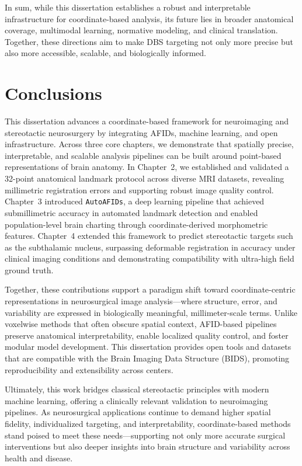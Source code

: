 In sum, while this dissertation establishes a robust and interpretable infrastructure for coordinate-based analysis, its future lies in broader anatomical coverage, multimodal learning, normative modeling, and clinical translation. Together, these directions aim to make DBS targeting not only more precise but also more accessible, scalable, and biologically informed.


\section{Conclusions}

This dissertation advances a coordinate-based framework for neuroimaging and stereotactic neurosurgery by integrating AFIDs, machine learning, and open infrastructure. Across three core chapters, we demonstrate that spatially precise, interpretable, and scalable analysis pipelines can be built around point-based representations of brain anatomy. In Chapter~2, we established and validated a 32-point anatomical landmark protocol across diverse MRI datasets, revealing millimetric registration errors and supporting robust image quality control. Chapter~3 introduced \texttt{AutoAFIDs}, a deep learning pipeline that achieved submillimetric accuracy in automated landmark detection and enabled population-level brain charting through coordinate-derived morphometric features. Chapter~4 extended this framework to predict stereotactic targets such as the subthalamic nucleus, surpassing deformable registration in accuracy under clinical imaging conditions and demonstrating compatibility with ultra-high field ground truth.

Together, these contributions support a paradigm shift toward coordinate-centric representations in neurosurgical image analysis—where structure, error, and variability are expressed in biologically meaningful, millimeter-scale terms. Unlike voxelwise methods that often obscure spatial context, AFID-based pipelines preserve anatomical interpretability, enable localized quality control, and foster modular model development. This dissertation provides open tools and datasets that are compatible with the Brain Imaging Data Structure (BIDS), promoting reproducibility and extensibility across centers.

Ultimately, this work bridges classical stereotactic principles with modern machine learning, offering a clinically relevant validation to neuroimaging pipelines. As neurosurgical applications continue to demand higher spatial fidelity, individualized targeting, and interpretability, coordinate-based methods stand poised to meet these needs—supporting not only more accurate surgical interventions but also deeper insights into brain structure and variability across health and disease.

